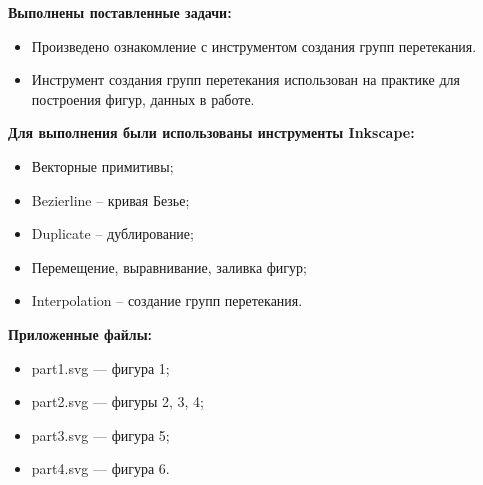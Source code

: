
\textbf{Выполнены поставленные задачи:}
\begin{itemize}
    \item Произведено ознакомление с инструментом создания групп перетекания.
    \item Инструмент создания групп перетекания использован на практике для построения
        фигур, данных в работе.
\end{itemize}
\hspace{0pt}

\textbf{Для выполнения были использованы инструменты Inkscape:}
\begin{itemize}
    \item Векторные примитивы;
    \item Bezierline -- кривая Безье;
    \item Duplicate -- дублирование;
    \item Перемещение, выравнивание, заливка фигур;
    \item Interpolation -- создание групп перетекания.
\end{itemize}
\hspace{0pt}

\textbf{Приложенные файлы:}
\begin{itemize}
    \item part1.svg --- фигура 1;
    \item part2.svg --- фигуры 2, 3, 4;
    \item part3.svg --- фигура 5;
    \item part4.svg --- фигура 6.
\end{itemize}


